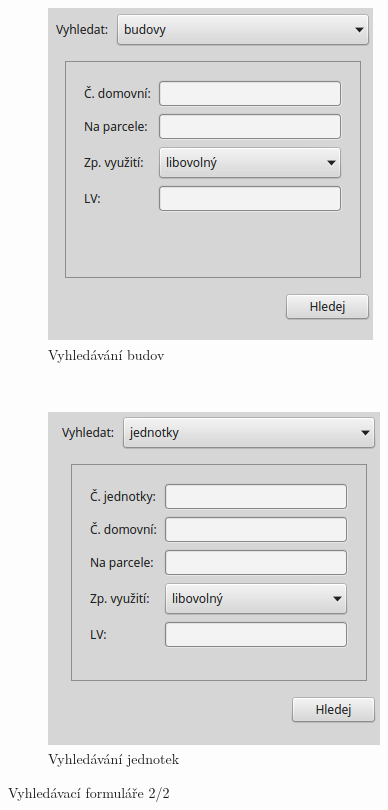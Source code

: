 \documentclass[a4paper,12pt,oneside]{book}
\begin{document}
\begin{figure}[htb]
    \centering
    \begin{subfigure}[b]{0.393\textwidth}
        \centering
        \includegraphics[width=\textwidth]{images/vfkPlugin-budovy.png}
        \caption{Vyhledávání budov}
    \end{subfigure}
    ~
    \begin{subfigure}[b]{0.4\textwidth}
        \centering
        \includegraphics[width=\textwidth]{images/vfkPlugin-jednotky.png}
        \caption{Vyhledávání jednotek}
    \end{subfigure}
    \caption{Vyhledávací formuláře 2/2}
    \label{l_vyhledavani_1}
\end{figure}
\end{document}
